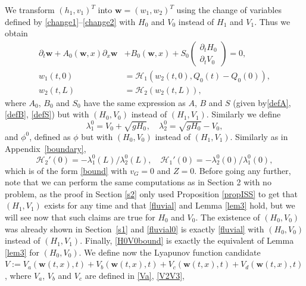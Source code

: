 \documentclass[11pt]{article}
\numberwithin{equation}{section}
\let\mathcal\mathscr
\theoremstyle{definition}
\begin{document}
We transform $(h_{1},v_{1})^{T}$ into $\boldsymbol{w}=(w_{1},w_{2})^{T}$ using the change of variables defined by
\eqref{change1}--\eqref{change2} with $H_{0}$ and $V_{0}$ instead of $H_{1}$ and $V_{1}$. Thus we obtain
\begin{equation}
\begin{split}
\partial_{t}\boldsymbol{w}+A_{0}(\boldsymbol{w},x)\partial_{x}\boldsymbol{w}&+B_{0}(\boldsymbol{w},x)+S_{0}\begin{pmatrix}\partial_{t}H_{0}\\ \partial_{t}V_{0}\end{pmatrix}=0,\\
w_{1}(t,0)&=\mathcal{H}_{1}(w_{2}(t,0),Q_{0}(t)-Q_{0}(0)),\\
w_{2}(t,L)&=\mathcal{H}_{2}(w_{2}(t,L)),
\end{split}
\label{sysw}
\end{equation}
where $A_{0}$, $B_{0}$ and $S_{0}$ have the same expression as $A$, $B$ and $S$ (given by\eqref{defA}, \eqref{defB}, \eqref{defS}) but with $(H_{0},V_{0})$ instead of $(H_{1}, V_{1})$. Similarly we define
\begin{equation*}
\lambda_{1}^{0}=V_{0}+\sqrt{gH_{0}},\quad\lambda_{2}^{0}=\sqrt{gH_{0}}-V_{0},
\end{equation*}
and $\phi^{0}$, defined as $\phi$ but with $(H_{0},V_{0})$ instead of $(H_{1}, V_{1})$.
Similarly as in Appendix~\ref{boundary},
\begin{equation*}
\mathcal{H}_{2}'(0)=-\lambda_{1}^{0}(L)/\lambda_{2}^{0}(L),\quad \mathcal{H}_{1}'(0)=-\lambda_{2}^{0}(0)/\lambda_{1}^{0}(0),
\end{equation*}
which is of the form \eqref{bound} with $v_{G}=0$ and $Z=0$.
Before going any further, note that we can perform the same computations as in Section 2 with no problem,
as the proof in Section \ref{s2} only used Proposition \ref{propISS} to get that $(H_{1},V_{1})$ exists for any time and that \eqref{fluvial} and Lemma \ref{lem3} hold, but we will see now that such claims are true for $H_{0}$ and $V_{0}$.
The existence of $(H_{0},V_{0})$ was already shown in Section~\ref{s1} and \eqref{fluvial0} is exactly \eqref{fluvial} with $(H_{0},V_{0})$ instead of $(H_{1},V_{1})$. Finally, \eqref{H0V0bound} is exactly the equivalent of Lemma \ref{lem3} for $(H_{0},V_{0})$.
We define now the Lyapunov function candidate $V:=V_{a}(\boldsymbol{w}(t,x),t)+V_{b}(\boldsymbol{w}(t,x),t)+V_{c}(\boldsymbol{w}(t,x),t)+V_{d}(\boldsymbol{w}(t,x),t)$, where $V_{a}$, $V_{b}$ and $V_{c}$ are defined in \eqref{Va}, \eqref{V2V3},
\end{document}
